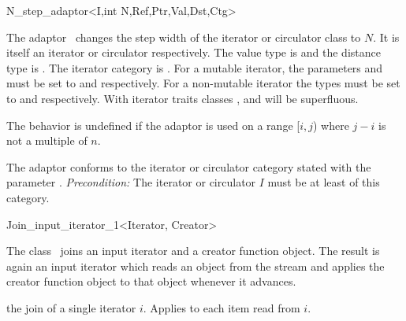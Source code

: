 \begin{ccRefClass}{N_step_adaptor<I,int N,Ref,Ptr,Val,Dst,Ctg>}
  
  \ccDefinition The adaptor \ccRefName\ changes the step width of the
  iterator or circulator class  to $N$. It is itself an
  iterator or circulator respectively. The value type is  and
  the distance type is . The iterator category is
  . For a mutable iterator, the parameters  and
   must be set to  and  respectively. For
  a non-mutable iterator the types must be set to  and
   respectively. With iterator traits classes
  ,  and  will be superfluous.
  
  The behavior is undefined if the adaptor is used on a range [$i,j$)
  where $j-i$ is not a multiple of $n$.
  
  
  \ccCreation
  
  
  \ccOperations
  
  The adaptor conforms to the iterator or circulator category stated
  with the parameter . {\em Precondition:\/} The iterator or
  circulator $I$ must be at least of this category.

\end{ccRefClass}


\begin{ccRefClass}{Join_input_iterator_1<Iterator, Creator>}
  \label{sectionJoinInputIterator}
  
  \ccDefinition The class \ccRefName\ joins an input iterator and a
  creator function object. The result is again an input iterator which
  reads an object from the stream and applies the creator function
  object to that object whenever it advances.

  
  \ccIsModel {}

  \ccTypes
  
  \ccCreation{}
  
   {the join of a
    single iterator $i$. Applies  to each item read from
    $i$.}

  \ccSeeAlso
\end{ccRefClass}


